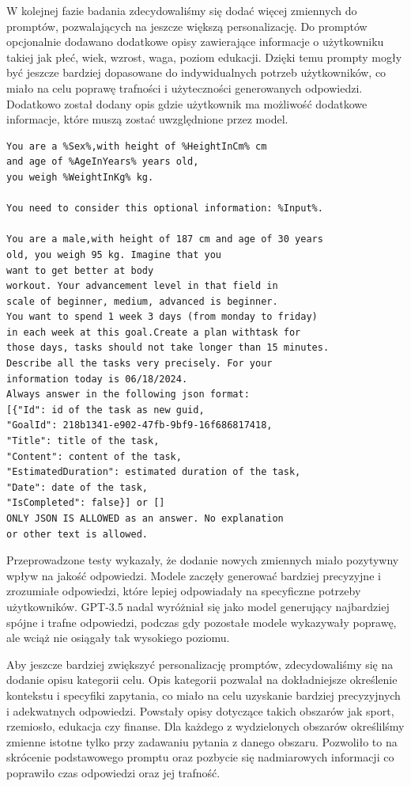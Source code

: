 W kolejnej fazie badania zdecydowaliśmy się dodać więcej zmiennych do promptów, pozwalających na jeszcze większą personalizację. Do promptów opcjonalnie dodawano dodatkowe opisy zawierające informacje o użytkowniku takiej jak płeć, wiek, wzrost, waga, poziom edukacji. Dzięki temu prompty mogły być jeszcze bardziej dopasowane do indywidualnych potrzeb użytkowników, co miało na celu poprawę trafności i użyteczności generowanych odpowiedzi. Dodatkowo został dodany opis gdzie użytkownik ma możliwość dodatkowe informacje, które muszą zostać uwzględnione przez model.

\begin{lstlisting}[language=html, caption=Nowy podstawowy prompt, linewidth=140mm]
You are a %Sex%,with height of %HeightInCm% cm 
and age of %AgeInYears% years old, 
you weigh %WeightInKg% kg.

You need to consider this optional information: %Input%.

You are a male,with height of 187 cm and age of 30 years
old, you weigh 95 kg. Imagine that you
want to get better at body
workout. Your advancement level in that field in 
scale of beginner, medium, advanced is beginner. 
You want to spend 1 week 3 days (from monday to friday)
in each week at this goal.Create a plan withtask for
those days, tasks should not take longer than 15 minutes.
Describe all the tasks very precisely. For your 
information today is 06/18/2024.
Always answer in the following json format:
[{"Id": id of the task as new guid,
"GoalId": 218b1341-e902-47fb-9bf9-16f686817418,
"Title": title of the task,
"Content": content of the task,
"EstimatedDuration": estimated duration of the task,
"Date": date of the task,
"IsCompleted": false}] or []
ONLY JSON IS ALLOWED as an answer. No explanation
or other text is allowed.

\end{lstlisting}

Przeprowadzone testy wykazały, że dodanie nowych zmiennych miało pozytywny wpływ na jakość odpowiedzi. Modele zaczęły generować bardziej precyzyjne i zrozumiałe odpowiedzi, które lepiej odpowiadały na specyficzne potrzeby użytkowników. GPT-3.5 nadal wyróżniał się jako model generujący najbardziej spójne i trafne odpowiedzi, podczas gdy pozostałe modele wykazywały poprawę, ale wciąż nie osiągały tak wysokiego poziomu.

Aby jeszcze bardziej zwiększyć personalizację promptów, zdecydowaliśmy się na dodanie opisu kategorii celu. Opis kategorii pozwalał na dokładniejsze określenie kontekstu i specyfiki zapytania, co miało na celu uzyskanie bardziej precyzyjnych i adekwatnych odpowiedzi. Powstały opisy dotyczące takich obszarów jak sport, rzemiosło, edukacja czy finanse. Dla każdego z wydzielonych obszarów określilśmy zmienne istotne tylko przy zadawaniu pytania z danego obszaru. Pozwoliło to na skrócenie podstawowego promptu oraz pozbycie się nadmiarowych informacji co poprawiło czas odpowiedzi oraz jej trafność.


